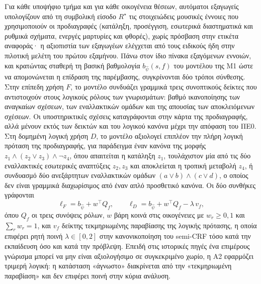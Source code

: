\documentclass[11pt,a4paper]{article}
\newcommand{\Rs}{R^{\star}}
\begin{document}
Για κάθε υποψήφιο τμήμα και για κάθε οικογένεια θέσεων, αυτόματοι εξαγωγείς υπολογίζουν από τη συμβολική είσοδο $\Rs$ τις στοιχειώδεις μουσικές έννοιες που χρησιμοποιούν οι προδιαγραφές (κατάληξη, προσέγγιση, εσωτερικά διαστηματικά και ρυθμικά σχήματα, ενεργές μαρτυρίες και φθορές), χωρίς πρόσβαση στην ετικέτα αναφοράς· η αξιοπιστία των εξαγωγέων ελέγχεται από τους ειδικούς ήδη στην πιλοτική μελέτη του πρώτου εξαμήνου. Πάνω στον ίδιο πίνακα εξαγόμενων εννοιών, και κρατώντας σταθερή τη βασική βαθμολογία $b_{\hat\psi}(s,f)$ του μοντέλου της Μ1 ώστε να απομονώνεται η επίδραση της παρέμβασης, συγκρίνονται δύο τρόποι σύνθεσης. Στην επίπεδη χρήση $F$, το μοντέλο συνδυάζει γραμμικά τρεις συνοπτικούς δείκτες που αντιστοιχούν στους λογικούς ρόλους των γνωρισμάτων: βαθμό ικανοποίησης των αναγκαίων σχέσεων, των εναλλακτικών ομάδων και της απουσίας των αποκλειόμενων σχέσεων. Οι υποστηρικτικές σχέσεις καταγράφονται στην κάρτα της προδιαγραφής, αλλά μένουν εκτός των δεικτών και του λογικού κανόνα μέχρι την απόφαση του ΠΕ0. Στη δομημένη λογική χρήση $D$, το μοντέλο αξιολογεί επιπλέον την πλήρη λογική πρόταση της προδιαγραφής, για παράδειγμα έναν κανόνα της μορφής $z_1\wedge(z_2\vee z_3)\wedge\neg z_4$, όπου απαιτείται η κατάληξη $z_1$, τουλάχιστον μία από τις δύο εναλλακτικές εσωτερικές αναπτύξεις $z_2,z_3$ και αποκλείεται η τροπική μεταβολή $z_4$, ή συνδυασμό δύο ανεξάρτητων εναλλακτικών ομάδων $(a\vee b)\wedge(c\vee d)$, ο οποίος δεν είναι γραμμικά διαχωρίσιμος από έναν απλό προσθετικό κανόνα. Οι δύο συνθήκες γράφονται
\[
\ell_{F}=b_{\hat\psi}+w^{\top}Q_f,\qquad
\ell_{D}=b_{\hat\psi}+w^{\top}Q_f-\lambda\,v_f,
\]
όπου $Q_f$ οι τρεις συνόψεις ρόλων, $w$ βάρη κοινά στις οικογένειες με $w_r\ge0{,}1$ και $\sum_rw_r=1$, και $v_f$ δείκτης τεκμηριωμένης παραβίασης της λογικής πρότασης, η οποία επιφέρει ρητή ποινή $\lambda\in[0,2]$ στην κανονικοποίηση του semi-CRF τόσο κατά την εκπαίδευση όσο και κατά την πρόβλεψη. Επειδή στις ιστορικές πηγές ένα επιμέρους γνώρισμα μπορεί να μην είναι αξιολογήσιμο σε συγκεκριμένο χωρίο, η Α2 εφαρμόζει τριμερή λογική: η κατάσταση «άγνωστο» διακρίνεται από την «τεκμηριωμένη παραβίαση» και δεν επιφέρει ποινή στην κύρια ανάλυση.
\end{document}
